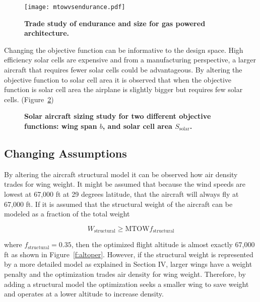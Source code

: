 \documentclass[]{aiaa-tc}%
\begin{document}
\begin{figure}[H]
	\begin{center}
	\texttt{[image: mtowvsendurance.pdf]}
    \caption{\textbf{Trade study of endurance and size for gas powered architecture.}}
	\label{f:spanvsendurance}
	\end{center}
\end{figure}

Changing the objective function can be informative to the design space. 
High efficiency solar cells are expensive and from a manufacturing perspective, a larger aircraft that requires fewer solar cells could be advantageous.
By altering the objective function to solar cell area it is observed that when the objective function is solar cell area the airplane is slightly bigger but requires few solar cells. (Figure~\ref{f:solarobjcomp})

\begin{figure}[H]
 \begin{subfigmatrix}{2}%
 \end{subfigmatrix}
    \caption{\textbf{Solar aircraft sizing study for two different objective functions: wing span $b$, and solar cell area $S_{\text{solar}}$.}}
    \label{f:solarobjcomp}
\end{figure}

\subsection{Changing Assumptions}

By altering the aircraft structural model it can be observed how air density trades for wing weight. 
It might be assumed that because the wind speeds are lowest at 67,000 ft at 29 degrees latitude, that the aircraft will always fly at 67,000 ft.  
If it is assumed that the structural weight of the aircraft can be modeled as a fraction of the total weight 

\begin{equation}
    W_{\text{structural}} \geq \text{MTOW} f_{\text{structural}}
\end{equation}

where $f_{\text{structural}} = 0.35$, then the optimized flight altitude is almost exactly 67,000 ft as shown in Figure~\ref{f:altoper}.  
However, if the structural weight is represented by a more detailed model as explained in Section IV, larger wings have a weight penalty and the optimization trades air density for wing weight.
Therefore, by adding a structural model the optimization seeks a smaller wing to save weight and operates at a lower altitude to increase density. 
\end{document}
